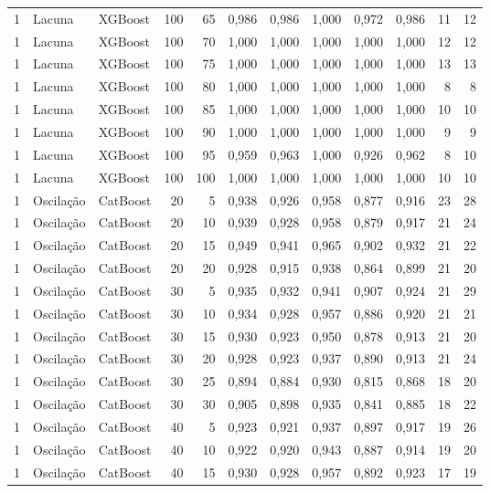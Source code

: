 \begin{longtable}{@{}rllrrrrrrrrr@{}}
1 & Lacuna & XGBoost & 100 & 65 & 0,986 & 0,986 & 1,000 & 0,972 & 0,986 & 11 & 12 \\
1 & Lacuna & XGBoost & 100 & 70 & 1,000 & 1,000 & 1,000 & 1,000 & 1,000 & 12 & 12 \\
1 & Lacuna & XGBoost & 100 & 75 & 1,000 & 1,000 & 1,000 & 1,000 & 1,000 & 13 & 13 \\
1 & Lacuna & XGBoost & 100 & 80 & 1,000 & 1,000 & 1,000 & 1,000 & 1,000 & 8 & 8 \\
1 & Lacuna & XGBoost & 100 & 85 & 1,000 & 1,000 & 1,000 & 1,000 & 1,000 & 10 & 10 \\
1 & Lacuna & XGBoost & 100 & 90 & 1,000 & 1,000 & 1,000 & 1,000 & 1,000 & 9 & 9 \\
1 & Lacuna & XGBoost & 100 & 95 & 0,959 & 0,963 & 1,000 & 0,926 & 0,962 & 8 & 10 \\
1 & Lacuna & XGBoost & 100 & 100 & 1,000 & 1,000 & 1,000 & 1,000 & 1,000 & 10 & 10 \\
1 & Oscilação & CatBoost & 20 & 5 & 0,938 & 0,926 & 0,958 & 0,877 & 0,916 & 23 & 28 \\
1 & Oscilação & CatBoost & 20 & 10 & 0,939 & 0,928 & 0,958 & 0,879 & 0,917 & 21 & 24 \\
1 & Oscilação & CatBoost & 20 & 15 & 0,949 & 0,941 & 0,965 & 0,902 & 0,932 & 21 & 22 \\
1 & Oscilação & CatBoost & 20 & 20 & 0,928 & 0,915 & 0,938 & 0,864 & 0,899 & 21 & 20 \\
1 & Oscilação & CatBoost & 30 & 5 & 0,935 & 0,932 & 0,941 & 0,907 & 0,924 & 21 & 29 \\
1 & Oscilação & CatBoost & 30 & 10 & 0,934 & 0,928 & 0,957 & 0,886 & 0,920 & 21 & 21 \\
1 & Oscilação & CatBoost & 30 & 15 & 0,930 & 0,923 & 0,950 & 0,878 & 0,913 & 21 & 20 \\
1 & Oscilação & CatBoost & 30 & 20 & 0,928 & 0,923 & 0,937 & 0,890 & 0,913 & 21 & 24 \\
1 & Oscilação & CatBoost & 30 & 25 & 0,894 & 0,884 & 0,930 & 0,815 & 0,868 & 18 & 20 \\
1 & Oscilação & CatBoost & 30 & 30 & 0,905 & 0,898 & 0,935 & 0,841 & 0,885 & 18 & 22 \\
1 & Oscilação & CatBoost & 40 & 5 & 0,923 & 0,921 & 0,937 & 0,897 & 0,917 & 19 & 26 \\
1 & Oscilação & CatBoost & 40 & 10 & 0,922 & 0,920 & 0,943 & 0,887 & 0,914 & 19 & 20 \\
1 & Oscilação & CatBoost & 40 & 15 & 0,930 & 0,928 & 0,957 & 0,892 & 0,923 & 17 & 19 \\

\end{longtable}
